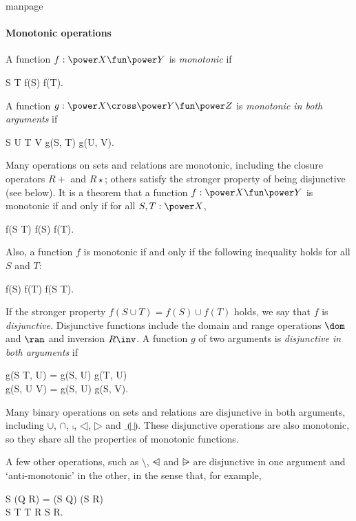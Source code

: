 \begin{pagestyle}{manpage}
\paragraph{Monotonic operations}\label{p:1090}\label{p:mono}

A function $f: \power X \fun \power Y$ is {\em monotonic\/}%
%
if
\begin{laws}
     S \subseteq T \implies f(S) \subseteq f(T).
\end{laws}
A function $g: \power X \cross \power Y \fun \power Z$ is {\em
monotonic in both arguments\/} if
\begin{laws}
    S \subseteq U \land T \subseteq V
	\implies g(S, T) \subseteq g(U, V).
\end{laws}
Many operations on sets and relations are monotonic, including the
closure operators $R \plus$ and $R \star$; others satisfy the
stronger property of being disjunctive (see below).
It is a theorem that a function $f: \power X \fun \power Y$ is
monotonic if and only if for all $S, T: \power X$,
\begin{laws}
	f(S \cap T) \subseteq f(S) \cap f(T).
\end{laws}
Also, a function $f$ is monotonic if and only if the following
inequality holds for all $S$ and $T$:
\begin{laws}
        f(S) \cup f(T) \subseteq f(S \cup T).
\end{laws}
If the stronger property
$f(S \cup T) = f(S) \cup f(T)$
holds, we say that $f$ is {\em disjunctive}. Disjunctive functions
include the domain and range operations $\dom$ and $\ran$ and
inversion $R \inv$.
A function $g$ of two arguments is {\em disjunctive in both
arguments\/} if
\begin{laws}
	g(S \cup T, U) = g(S, U) \cup g(T, U) \\
	g(S, U \cup V) = g(S, U) \cup g(S, V).
\end{laws} 
Many binary operations on sets and relations are disjunctive in both
arguments, including $\cup$, $\cap$, $\comp$, $\dres$, $\rres$ and
$\_\limg\_\rimg$. These disjunctive operations are also monotonic,
so they share all the properties of monotonic functions.

A few other operations, such as $\setminus$, $\ndres$ and $\nrres$
are disjunctive in one argument and `anti-monotonic' in the other,
in the sense that, for example,
\begin{laws}
        S \ndres (Q \cup R) = (S \ndres Q) \cup (S \ndres R) \\
        S \subseteq T \implies T \ndres R \subseteq S \ndres R.
\end{laws}


\end{pagestyle}
